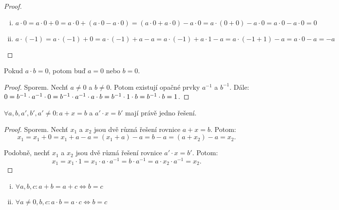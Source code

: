 \begin{proof}
    \leavevmode
    \begin{enumerate}[i.]
        \item $a \cdot 0 = a \cdot 0 + 0 = a \cdot 0 + (a \cdot 0 - a \cdot 
                0) = (a \cdot 0 + a \cdot 0) - a \cdot 0 = a \cdot (0 + 0) 
                - a \cdot 0 = a \cdot 0 - a \cdot 0 = 0$
        \item $a \cdot (-1) = a\cdot(-1) + 0 = a\cdot(-1) + a - a = a \cdot
            (-1) + a \cdot 1 - a = a \cdot (-1 + 1) -a = a \cdot 0 - a = -a$
    \end{enumerate}
\end{proof}

\begin{observation}
    \label{obs:abeq0}
    Pokud $a \cdot b = 0$, potom buď $a = 0$ nebo $b = 0$.
\end{observation}

\begin{proof}
    Sporem. Nechť $a \neq 0$ a $b \neq 0$. Potom existují opačné prvky $a^{-1}$
    a $b^{-1}$. Dále: $0 = b^{-1} \cdot a^{-1} \cdot 0 = b^{-1} \cdot 
    a^{-1} \cdot a \cdot b = b^{-1} \cdot 1 \cdot b = b^{-1} \cdot b = 1$.
\end{proof}

\begin{observation}
    \leavevmode
    $\forall a, b, a', b', a' \neq 0: a + x = b$ a $a' \cdot x = b'$ mají 
    právě jedno řešení.
\end{observation}

\begin{proof}
    Sporem. Nechť $x_1$ a $x_2$ jsou dvě různá řešení rovnice $a + x = b$. 
    Potom: 
    $$ x_1 = x_1 + 0 = x_1 + a - a = (x_1 + a) - a = b - a = (a+x_2) - a = 
    x_2.$$

    Podobně, nechť $x_1$ a $x_2$ jsou dvě různá řešení rovnice $a' \cdot 
    x = b'$. Potom:
    $$x_1 = x_1 \cdot 1 = x_1 \cdot a \cdot a^{-1} = b\cdot a^{-1} = a 
    \cdot x_2 \cdot a^{-1} = x_2.$$
\end{proof}

\begin{observation}
    \leavevmode
    \begin{enumerate}[i.]
        \item $\forall a,b,c: a + b = a + c \iff b = c$
        \item $\forall a \neq 0,b,c: a \cdot b = a \cdot c \iff b = c$
    \end{enumerate}
\end{observation}

